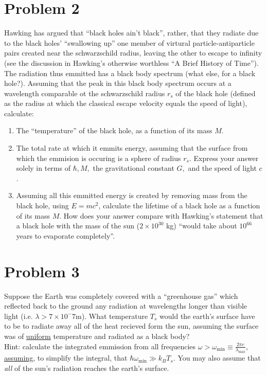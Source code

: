 \documentclass[12pt]{article}
\begin{document}
\section*{Problem 2}
Hawking has argued that ``black holes ain't black'', rather, that they radiate due to the black holes' ``swallowing up'' one member of virtural particle-antiparticle pairs created near the schwarzschild radius, leaving the other to escape to infinity (see the discussion in Hawking's otherwise worthless ``A Brief History of Time''). The radiation thus emmitted has a black body spectrum (what else, for a black hole?). Assuming that the peak in this black body spectrum occurs at a wavelength comparable ot the schwarzschild radius $r_s$ of the black hole (defined as the radius at which the classical escape velocity equals the speed of light), calculate:
\begin{enumerate}[label=(\alph*)]
    \item The ``temperature'' of the black hole, as a function of its mass $M$.
    \item The total rate at which it emmits energy, assuming that the surface from which the emmision is occuring is a sphere of radius $r_s$. Express your answer solely in terms of $\hbar, M,$ the gravitational constant $G, $ and the speed of light $c$.
    \item Assuming all this emmitted energy is created by removing mass from the black hole, using $E=mc^2$, calculate the lifetime of a black hole as a function of its mass $M$. How does your answer compare with Hawking's statement that a black hole with the mass of the sun ($2\times 10^{30}$ kg) ``would take about $10^{66}$ years to evaporate completely''.
\end{enumerate} 

\section*{Problem 3}
Suppose the Earth was completely covered with a ``greenhouse gas'' which reflected back to the ground any radiation at wavelengths longer than visible light (i.e. $\lambda > 7\times 10^-7$m). What temperature $T_s$ would the earth's surface have to be to radiate away all of the heat recieved form the sun, assuming the surface was of \underline{uniform} temperature and radiated as a black body? \\
Hint: calculate the integrated emmission from all frequencies $\omega > \omega_\text{min} \equiv \frac{2\pi c}{\lambda_\text{max}}$, \underline{assuming}, to simplify the integral, that $\hbar\omega_\text{min} \gg k_B T_s$. You may also assume that \textit{all} of the sun's radiation reaches the earth's surface.
\end{document}
